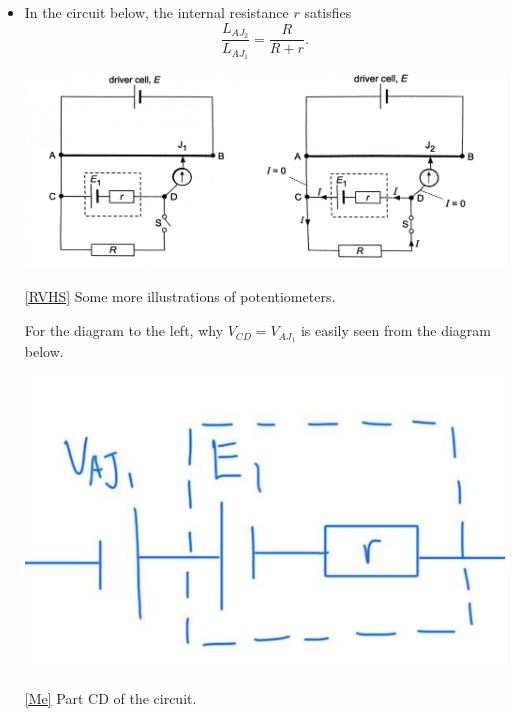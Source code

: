 \documentclass[oneside]{book}
\begin{document}
\begin{itemize}
\begin{itemize}
\begin{center}
            \captionsetup{type=figure}
            \caption[figure]{\ref{RVHS} An illustration of a potentiometer.}
        \end{center}
        \item In the circuit below, the internal resistance \(r\) satisfies
        \[\frac{L_{AJ_2}}{L_{AJ_1}}=\frac{R}{R+r}.\]
        \begin{center}
            \includegraphics[width=0.88\columnwidth]{../images/DC-Circuits-Potentiometer-2.jpg}
            \captionsetup{type=figure}
            \caption[figure]{\ref{RVHS} Some more illustrations of potentiometers.}
        \end{center}
        For the diagram to the left, why \(V_{CD}=V_{AJ_1}\) is easily seen from the diagram below.
        \begin{center}
            \includegraphics[width=0.3\columnwidth]{../images/D.C.-Voltage-Cancelling-Each-Other.png}
            \captionsetup{type=figure}
            \caption[figure]{\ref{Me} Part CD of the circuit.}
        \end{center}
    \end{itemize}
\end{itemize}
\end{document}
